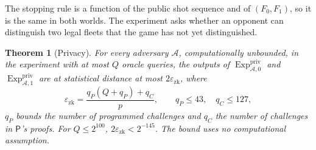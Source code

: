 \documentclass[11pt]{article}
\newtheorem{theorem}[lemma]{Theorem}
\theoremstyle{definition}
\theoremstyle{remark}
\newcommand{\Exp}{\operatorname{Exp}}
\begin{document}
The stopping rule is a function of the public shot sequence and of $(F_0,F_1)$, so it is the same in both worlds. The experiment asks whether an opponent can distinguish two legal fleets that the game has not yet distinguished.

\begin{theorem}[Privacy]\label{thm:privacy}
For every adversary $\mathcal A$, computationally unbounded, in the experiment with at most $Q$ oracle queries, the outputs of $\Exp^{\mathrm{priv}}_{\mathcal A,0}$ and $\Exp^{\mathrm{priv}}_{\mathcal A,1}$ are at statistical distance at most $2\varepsilon_{\mathrm{zk}}$, where
\[
  \varepsilon_{\mathrm{zk}}=\frac{q_P(Q+q_P)+q_C}{p},\qquad q_P\le 43,\quad q_C\le 127,
\]
$q_P$ bounds the number of programmed challenges and $q_C$ the number of challenges in $\mathsf P$'s proofs. For $Q\le2^{100}$, $2\varepsilon_{\mathrm{zk}}<2^{-145}$. The bound uses no computational assumption.
\end{theorem}
\end{document}
